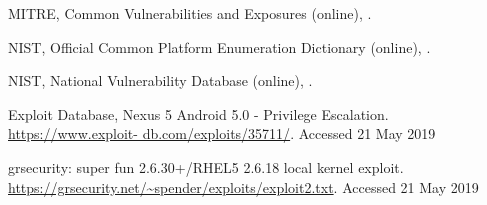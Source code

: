 \documentclass[english,sigrecommended,JIP]{ipsj}
\begin{document}










\begin{thebibliography}{99}


    MITRE, Common Vulnerabilities and Exposures (online),
      .
    
    NIST, Official Common Platform Enumeration Dictionary (online), 
      .    


    NIST,  National Vulnerability Database (online),
     .    

  Exploit Database, Nexus 5 Android 5.0 - Privilege Escalation. \url{https://www.exploit- db.com/exploits/35711/}. Accessed 21 May 2019    

  grsecurity: super fun 2.6.30+/RHEL5 2.6.18 local kernel exploit. \url{https://grsecurity.net/~spender/exploits/exploit2.txt}. Accessed 21 May 2019  



\end{thebibliography}
\end{document}
